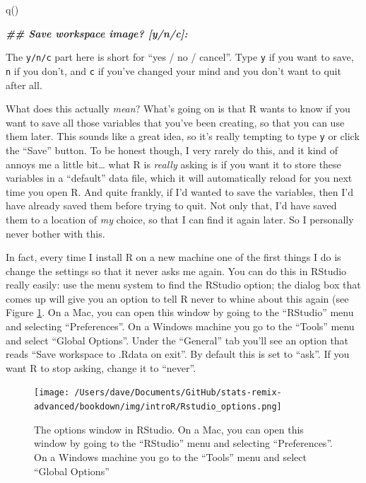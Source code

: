 \documentclass[
]{book}
\newenvironment{Shaded}{\begin{snugshade}}{\end{snugshade}}
\newcommand{\DocumentationTok}[1]{\textcolor[rgb]{0.56,0.35,0.01}{\textbf{\textit{#1}}}}
\newcommand{\FunctionTok}[1]{\textcolor[rgb]{0.00,0.00,0.00}{#1}}
\newcommand{\NormalTok}[1]{#1}
\begin{document}
\begin{Shaded}
\begin{Highlighting}[]
\FunctionTok{q}\NormalTok{()}

\DocumentationTok{\#\# Save workspace image? [y/n/c]: }
\end{Highlighting}
\end{Shaded}

The \texttt{y/n/c} part here is short for ``yes / no / cancel''. Type \texttt{y} if you want to save, \texttt{n} if you don't, and \texttt{c} if you've changed your mind and you don't want to quit after all.

What does this actually \emph{mean}? What's going on is that R wants to know if you want to save all those variables that you've been creating, so that you can use them later. This sounds like a great idea, so it's really tempting to type \texttt{y} or click the ``Save'' button. To be honest though, I very rarely do this, and it kind of annoys me a little bit\ldots{} what R is \emph{really} asking is if you want it to store these variables in a ``default'' data file, which it will automatically reload for you next time you open R. And quite frankly, if I'd wanted to save the variables, then I'd have already saved them before trying to quit. Not only that, I'd have saved them to a location of \emph{my} choice, so that I can find it again later. So I personally never bother with this.

In fact, every time I install R on a new machine one of the first things I do is change the settings so that it never asks me again. You can do this in RStudio really easily: use the menu system to find the RStudio option; the dialog box that comes up will give you an option to tell R never to whine about this again (see Figure \ref{fig:RStudiooptions}. On a Mac, you can open this window by going to the ``RStudio'' menu and selecting ``Preferences''. On a Windows machine you go to the ``Tools'' menu and select ``Global Options''. Under the ``General'' tab you'll see an option that reads ``Save workspace to .Rdata on exit''. By default this is set to ``ask''. If you want R to stop asking, change it to ``never''.

\begin{figure}
\centering
\texttt{[image: /Users/dave/Documents/GitHub/stats-remix-advanced/bookdown/img/introR/Rstudio\_options.png]}
\caption{\label{fig:RStudiooptions}The options window in RStudio. On a Mac, you can open this window by going to the ``RStudio'' menu and selecting ``Preferences''. On a Windows machine you go to the ``Tools'' menu and select ``Global Options''}
\end{figure}
\end{document}
